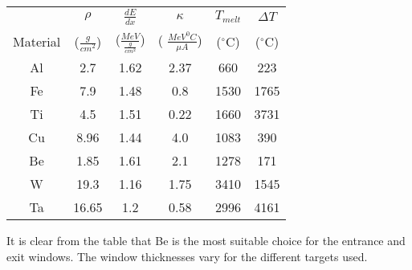 {\begin{center}\begin{tabular}{|c|c|c|c|c|c|}
\hline 
&
 $\rho $&
 $\frac{dE}{dx}$&
 $\kappa $&
 $T_{melt}$&
 $\Delta T$\\
 Material &
 ($\frac{g}{cm^{2}}$) &
 ($\frac{MeV}{\frac{g}{cm^{2}}}$) &
 ( $\frac{MeV^{0}C}{\mu A}$) &
 ($^{\circ }$C) &
 ($^{\circ }$C) \\
\hline
Al &
2.7 &
1.62 &
2.37 &
660 &
223 \\
\hline
Fe &
7.9 &
1.48 &
0.8 &
1530 &
1765 \\
\hline
Ti &
4.5 &
1.51 &
0.22 &
1660 &
3731 \\
\hline
Cu &
8.96 &
1.44 &
4.0&
1083 &
390 \\
\hline
Be &
1.85 &
1.61 &
2.1 &
1278 &
171 \\
\hline
W &
19.3 &
1.16 &
1.75 &
3410 &
1545 \\
\hline
Ta &
16.65 &
1.2 &
0.58 &
2996 &
4161  \\
\hline
\end{tabular}\end{center}

It is clear from the table that Be is the most suitable choice for
the entrance and exit windows. The window thicknesses vary for the
different targets used.

} %
